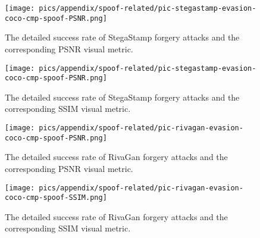 \begin{figure}[!t]
\begin{minipage}{0.48\linewidth}
    \centering
    \texttt{[image: pics/appendix/spoof-related/pic-stegastamp-evasion-coco-cmp-spoof-PSNR.png]} 
    \label{fig:spoof-related-stegastamp-psnr}
    \vspace{-6mm}
    \caption{The detailed success rate of StegaStamp forgery attacks and the corresponding PSNR visual metric.}
    \label{fig:spoof-related-stegastamp-psnr}
\end{minipage}\hfill
\begin{minipage}{0.48\linewidth}
    \centering
    \texttt{[image: pics/appendix/spoof-related/pic-stegastamp-evasion-coco-cmp-spoof-PSNR.png]} 
    
    \vspace{-6mm}
    \caption{The detailed success rate of StegaStamp forgery attacks and the corresponding SSIM visual metric.}
    \label{fig:spoof-related-stegastamp-ssim}
\end{minipage}
\end{figure}

\begin{figure}[!t]
\begin{minipage}{0.48\linewidth}
    \centering
    \texttt{[image: pics/appendix/spoof-related/pic-rivagan-evasion-coco-cmp-spoof-PSNR.png]} 
    
    \vspace{-6mm}
    \caption{The detailed success rate of RivaGan forgery attacks and the corresponding PSNR visual metric.}
    \label{fig:spoof-related-rivagan-psnr}
\end{minipage}\hfill
\begin{minipage}{0.48\linewidth}
    \centering
    \texttt{[image: pics/appendix/spoof-related/pic-rivagan-evasion-coco-cmp-spoof-SSIM.png]} 
    
    \vspace{-6mm}
    \caption{The detailed success rate of RivaGan forgery attacks and the corresponding SSIM visual metric.}
    \label{fig:spoof-related-rivagan-ssim}
\end{minipage}
\end{figure}


